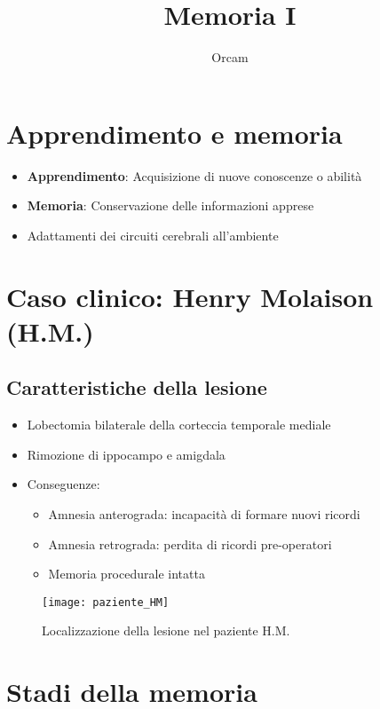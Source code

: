 \documentclass[11pt]{article}
\title{Memoria I}
\author{Orcam}
\date{}
\begin{document}
\maketitle

\section*{Apprendimento e memoria}

\begin{itemize}
    \item \textbf{Apprendimento}: Acquisizione di nuove conoscenze o abilità
    \item \textbf{Memoria}: Conservazione delle informazioni apprese
    \item Adattamenti dei circuiti cerebrali all'ambiente
\end{itemize}

\section*{Caso clinico: Henry Molaison (H.M.)}

\subsection*{Caratteristiche della lesione}
\begin{itemize}
    \item Lobectomia bilaterale della corteccia temporale mediale
    \item Rimozione di ippocampo e amigdala
    \item Conseguenze:
    \begin{itemize}
        \item Amnesia anterograda: incapacità di formare nuovi ricordi
        \item Amnesia retrograda: perdita di ricordi pre-operatori
        \item Memoria procedurale intatta
    \end{itemize}
\end{itemize}

\begin{figure}[h]
    \centering
    \texttt{[image: paziente\_HM]} %
    \caption{Localizzazione della lesione nel paziente H.M.}
    \label{fig:hm}
\end{figure}

\section*{Stadi della memoria}
\end{document}
